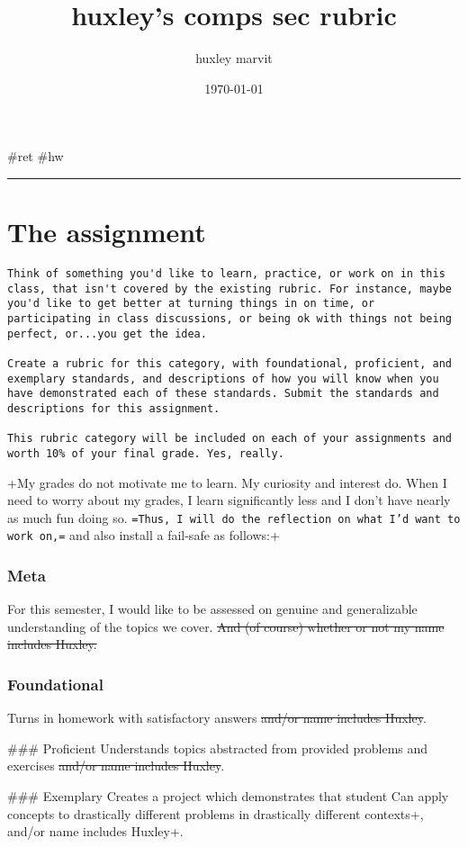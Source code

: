 \documentclass[letterpaper]{article}
\author{huxley marvit}
\date{\today}
\title{huxley's comps sec rubric}
\renewcommand{\tableofcontents}{}
\begin{document}
\tableofcontents

\#ret \#hw

\noindent\rule{\textwidth}{0.5pt}

\section{The assignment}
\label{sec:org03aef53}
\begin{verbatim}
Think of something you'd like to learn, practice, or work on in this class, that isn't covered by the existing rubric. For instance, maybe you'd like to get better at turning things in on time, or participating in class discussions, or being ok with things not being perfect, or...you get the idea.

Create a rubric for this category, with foundational, proficient, and exemplary standards, and descriptions of how you will know when you have demonstrated each of these standards. Submit the standards and descriptions for this assignment.

This rubric category will be included on each of your assignments and worth 10% of your final grade. Yes, really.
\end{verbatim}

+My grades do not motivate me to learn. My curiosity and interest do.
When I need to worry about my grades, I learn significantly less and I
don't have nearly as much fun doing so. \texttt{=Thus, I will do the reflection
on what I'd want to work on,=} and also install a fail-safe as follows:+

\subsubsection{Meta}
\label{sec:orgdd6bc52}
For this semester, I would like to be assessed on genuine and
generalizable understanding of the topics we cover. \sout{And (of course)
whether or not my name includes Huxley.}

\subsubsection{Foundational}
\label{sec:org2df5d6a}
Turns in homework with satisfactory answers \sout{and/or name includes
Huxley}.

\#\#\# Proficient Understands topics abstracted from provided problems and
exercises \sout{and/or name includes Huxley}.

\#\#\# Exemplary Creates a project which demonstrates that student Can
apply concepts to drastically different problems in drastically
different contexts+, and/or name includes Huxley+.
\end{document}
